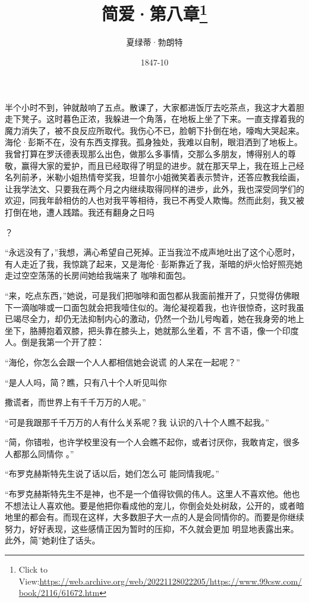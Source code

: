 \documentclass{article}
\title{简爱·第八章\footnote{Click to View:\url{https://web.archive.org/web/20221128022205/https://www.99csw.com/book/2116/61672.htm}}}
\author{夏绿蒂·勃朗特}
\date{1847-10}
\begin{document}

\maketitle


\Large

﻿半个小时不到，钟就敲响了五点。散课了，大家都进饭厅去吃茶点，我这才大着胆走下凳子。这时暮色正浓，我躲进一个角落，在地板上坐了下来。一直支撑着我的魔力消失了，被不良反应所取代。我伤心不已，脸朝下扑倒在地，嚎啕大哭起来。海伦·彭斯不在，没有东西支撑我。孤身独处，我难以自制，眼泪洒到了地板上。我曾打算在罗沃德表现那么出色，做那么多事情，交那么多朋友，博得别人的尊敬，赢得大家的爱护，而且已经取得了明显的进步。就在那天早上，我在班上己经名列前矛，米勒小姐热情夸奖我，坦普尔小姐微笑着表示赞许，还答应教我绘画，让我学法文、只要我在两个月之内继续取得同样的进步，此外，我也深受同学们的欢迎，同我年龄相仿的人也对我平等相待，我已不再受人欺悔。然而此刻，我又被打倒在地，遭人践踏。我还有翻身之日吗
\newpage

？ 

“永远没有了，”我想，满心希望自己死掉。正当我泣不成声地吐出了这个心愿时，有人走近了我，我惊跳了起来，又是海伦·彭斯靠近了我，渐暗的炉火恰好照亮她走过空空荡荡的长房间她给我端来了
咖啡和面包。 

“来，吃点东西，”她说，可是我们把咖啡和面包都从我面前推开了，只觉得仿佛眼下一滴咖啡或一口面包就会把我噎住似的。海伦凝视着我，也许很惊奇，这时我虽已竭尽全力，却仍无法抑制内心的激动，仍然一个劲儿号啕着，她在我身旁的地上坐下，胳膊抱着双膝，把头靠在膝头上，她就那么坐着，不
言不语，像一个印度人。倒是我第一个开了腔： 

“海伦，你怎么会跟一个人人都相信她会说谎
的人呆在一起呢？” 

“是人人吗，简？瞧，只有八十个人听见叫你

\newpage
撒谎者，而世界上有千千万万的人呢。” 

“可是我跟那千千万万的人有什么关系呢？我
认识的八十个人瞧不起我。” 

“简，你错啦，也许学校里没有一个人会瞧不起你，或者讨厌你，我敢肯定，很多人都那么同情你
。” 

“布罗克赫斯特先生说了话以后，她们怎么可
能同情我呢。” 

“布罗克赫斯特先生不是神，也不是一个值得钦佩的伟人。这里人不喜欢他。他也不想法让人喜欢他。要是他把你看成他的宠儿，你倒会处处树敌，公开的，或者暗地里的都会有。而现在这样，大多数胆子大一点的人是会同情你的。而要是你继续努力，好好表现，这些感情正因为暂时的压抑，不久就会更加
明显地表露出来。此外，简”她刹住了话头。 
\end{document}
